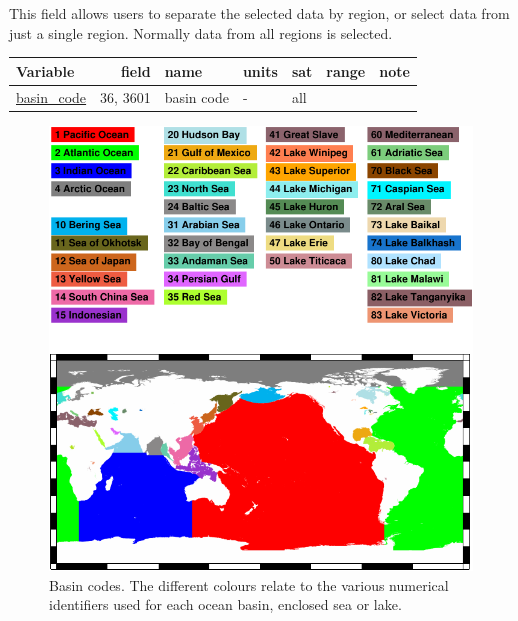 \documentclass[a4paper,11pt,openany,natbib,nomargin]{thesis}
\makeatletter
\newcommand\var[1]{\url{#1}\index{variables!#1@\protect\url{#1}}}
\newenvironment{vartable}{
\begin{table}[ht]
\small
\begin{tabular}{lrllllr}
\hline
Variable & field & name & units & sat & range & note \\
\hline
}{
\hline
\end{tabular}
\end{table}
}
\makeatother
\begin{document}
This field allows users to separate the selected data by region, or select data from just a single region. Normally data from all regions is selected.

\begin{vartable}
\var{basin_code} & 36, 3601 & basin code & - & all && \\
\end{vartable}

\begin{figure}
\includegraphics[width=\textwidth]{basin_codes}
\caption{Basin codes. The different colours relate to the various numerical identifiers used for each ocean basin, enclosed sea or lake.}
\label{fig:basin_codes}
\end{figure}


\printindex
\end{document}
